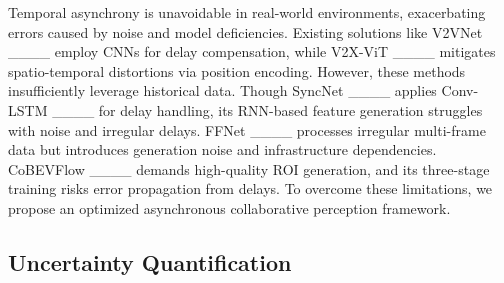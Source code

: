 Temporal asynchrony is unavoidable in real-world environments, exacerbating errors caused by noise and model deficiencies. Existing solutions like V2VNet ____ employ CNNs for delay compensation, while V2X-ViT ____ mitigates spatio-temporal distortions via position encoding. However, these methods insufficiently leverage historical data. Though SyncNet ____ applies Conv-LSTM ____ for delay handling, its RNN-based feature generation struggles with noise and irregular delays. FFNet ____ processes irregular multi-frame data but introduces generation noise and infrastructure dependencies. CoBEVFlow ____ demands high-quality ROI generation, and its three-stage training risks error propagation from delays. To overcome these limitations, we propose an optimized asynchronous collaborative perception framework.


\subsection{Uncertainty Quantiﬁcation}

